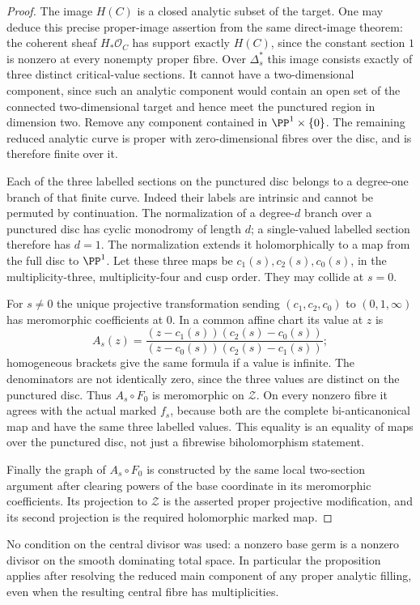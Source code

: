 \begin{proof}
The image $H(C)$ is a closed analytic subset of the target.
One may deduce this precise proper-image assertion from the same
direct-image theorem: the coherent sheaf
$H_*\mathcal O_C$ has support exactly $H(C)$, since the
constant section $1$ is nonzero at every nonempty proper fibre.
Over $\Delta_s^*$ this image consists exactly of three distinct
critical-value sections. It cannot have a two-dimensional
component, since such an analytic component would contain an
open set of the connected two-dimensional target and hence meet
the punctured region in dimension two. Remove any component
contained in $\PP^1\times\{0\}$. The remaining reduced
analytic curve is proper with zero-dimensional fibres over the
disc, and is therefore finite over it.

Each of the three labelled sections on the punctured disc belongs
to a degree-one branch of that finite curve. Indeed their labels
are intrinsic and cannot be permuted by continuation. The
normalization of a degree-$d$ branch over a punctured disc has
cyclic monodromy of length $d$; a single-valued labelled section
therefore has $d=1$. The normalization extends it holomorphically
to a map from the full disc to $\PP^1$. Let these three maps be
$c_1(s),c_2(s),c_0(s)$, in the multiplicity-three,
multiplicity-four and cusp order. They may collide at $s=0$.

For $s\ne0$ the unique projective transformation sending
$(c_1,c_2,c_0)$ to $(0,1,\infty)$ has meromorphic coefficients
at $0$. In a common affine chart its value at $z$ is
\[
 A_s(z)=
 \frac{(z-c_1(s))(c_2(s)-c_0(s))}
      {(z-c_0(s))(c_2(s)-c_1(s))};
\]
homogeneous brackets give the same formula if a value is infinite.
The denominators are not identically zero, since the three values
are distinct on the punctured disc. Thus $A_s\circ F_0$ is
meromorphic on $\mathcal Z$. On every nonzero fibre it agrees
with the actual marked $f_s$, because both are the complete
bi-anticanonical map and have the same three labelled values.
This equality is an equality of maps over the punctured disc,
not just a fibrewise biholomorphism statement.

Finally the graph of $A_s\circ F_0$ is constructed by the same
local two-section argument after clearing powers of the base
coordinate in its meromorphic coefficients. Its projection to
$\mathcal Z$ is the asserted proper projective modification,
and its second projection is the required holomorphic marked map.
\end{proof}

No condition on the central divisor was used: a nonzero base
germ is a nonzero divisor on the smooth dominating total space.
In particular the proposition applies after resolving the
reduced main component of any proper analytic filling, even
when the resulting central fibre has multiplicities.

